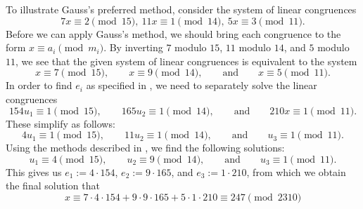 \begin{example}
  To illustrate Gauss's preferred method, consider the system of linear congruences
  \begin{equation*}
    7x\equiv 2\pmod{15},~11x\equiv 1\pmod{14},~5x\equiv 3\pmod{11}.
  \end{equation*}
  Before we can apply Gauss's method, we should bring each congruence to the form $x\equiv a_i\pmod{m_i}$. By inverting $7$ modulo $15$, $11$ modulo $14$, and $5$ modulo $11$, we see that the given system of linear congruences is equivalent to the system
  \begin{equation*}
    x\equiv 7\pmod{15},\qquad x\equiv 9\pmod{14},\qquad\text{and}\qquad x\equiv 5\pmod{11}.
  \end{equation*}
  In order to find $e_i$ as specified in , we need to separately solve the linear congruences
  \begin{equation*}
    154u_1\equiv 1\pmod{15},\qquad 165u_2\equiv 1\pmod{14},\qquad\text{and}\qquad 210x\equiv 1\pmod{11}.
  \end{equation*}
  These simplify as follows:
  \begin{equation*}
    4u_1\equiv 1\pmod{15},\qquad 11 u_2\equiv 1\pmod{14},\qquad\text{and}\qquad u_3 \equiv 1\pmod{11}.
  \end{equation*}
  Using the methods described in , we find the following solutions:
  \begin{equation*}
    u_1 \equiv 4\pmod{15},\qquad u_2\equiv 9\pmod{14},\qquad\text{and}\qquad u_3\equiv 1\pmod{11}.
  \end{equation*}
  This gives us $e_1:= 4\cdot 154$, $e_2:= 9\cdot 165$, and $e_3:= 1\cdot 210$, from which we obtain the final solution that
  \begin{equation*}
    x\equiv 7\cdot 4\cdot 154 + 9\cdot 9\cdot 165 + 5\cdot 1\cdot 210 \equiv 247 \pmod{2310}
  \end{equation*}
\end{example}



